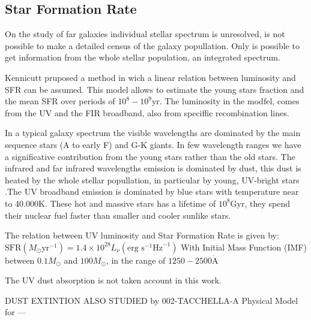 \subsection{Star Formation Rate}

On the study of far galaxies individual stellar spectrum is unresolved, is not 
possible to make a detailed census of the galaxy popullation. Only is possible 
to get information from the whole stellar population, an integrated spectrum.

Kennicutt pruposed a method in wich a linear relation between luminosity and 
SFR can be assumed. This model allows to estimate the young stars fraction and 
the mean SFR over periods of $10^8 - 10^9 \textrm{yr}$. The luminosity in the 
modfel, comes from the UV and the FIR broadband, also from speciffic 
recombination lines. 

In a typical galaxy spectrum the visible wavelengths are dominated by the main 
sequence stars (A to early F) and G-K giants. In few wavelength ranges we have 
a significative contribution from the young stars rather than the old stars. 
The infrared and far infrared wavelengths emission is dominated by dust, this 
dust is  heated by the whole stellar popullation, in particular by young, 
UV-bright stars \citep{law11}.The UV broadband emission is dominated by blue 
stars with temperature near to 40.000K. These hot and massive stars has a 
lifetime of $10^8\textrm{Gyr}$, they spend their nuclear fuel faster than smaller 
and cooler sunlike stars.

The relation between UV luminosity and Star Formation Rate \citep{kennicutt98} 
is given by:
  $ \textrm{SFR}\left(M_\odot \textrm{yr}^{-1}\right) 
      = 1.4 \times 10^{28} L_{\nu} \left( \textrm{erg s}^{-1}\textrm{Hz}^{-1} 
\right)$
  With Initial Mass Function (IMF) between $0.1 M_\odot$ 
  and $100 M_\odot$, in the range of $1250-2500 \mathring{\textrm{A}} $

The UV dust absorption \citep{kennicutt09} is not taken account in this work.

DUST EXTINTION ALSO STUDIED by 002-TACCHELLA-A Physical Model for ---








